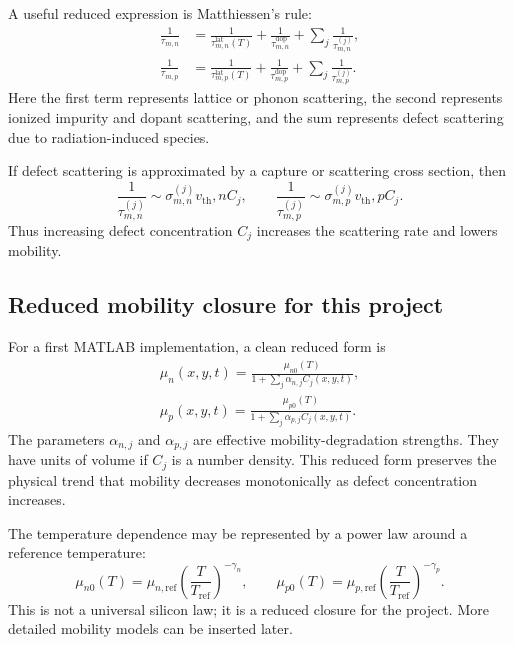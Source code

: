 \documentclass[11pt]{article}
\newcommand{\vt}{v_{\mathrm{th}}}
\begin{document}
A useful reduced expression is Matthiessen's rule:
\begin{align}
\frac{1}{\tau_{m,n}}&=\frac{1}{\tau_{m,n}^{\mathrm{lat}}(T)}+\frac{1}{\tau_{m,n}^{\mathrm{dop}}}+\sum_j \frac{1}{\tau_{m,n}^{(j)}}, \\
\frac{1}{\tau_{m,p}}&=\frac{1}{\tau_{m,p}^{\mathrm{lat}}(T)}+\frac{1}{\tau_{m,p}^{\mathrm{dop}}}+\sum_j \frac{1}{\tau_{m,p}^{(j)}}.
\end{align}
Here the first term represents lattice or phonon scattering, the second represents ionized impurity and dopant scattering, and the sum represents defect scattering due to radiation-induced species.

If defect scattering is approximated by a capture or scattering cross section, then
\begin{equation}
\frac{1}{\tau_{m,n}^{(j)}}\sim \sigma_{m,n}^{(j)} \vt,n C_j,
\qquad
\frac{1}{\tau_{m,p}^{(j)}}\sim \sigma_{m,p}^{(j)} \vt,p C_j.
\end{equation}
Thus increasing defect concentration \(C_j\) increases the scattering rate and lowers mobility.

\subsection{Reduced mobility closure for this project}

For a first MATLAB implementation, a clean reduced form is
\begin{align}
\boxed{\mu_n(x,y,t)=\frac{\mu_{n0}(T)}{1+\sum_j \alpha_{n,j} C_j(x,y,t)},} \\
\boxed{\mu_p(x,y,t)=\frac{\mu_{p0}(T)}{1+\sum_j \alpha_{p,j} C_j(x,y,t)}.}
\end{align}
The parameters \(\alpha_{n,j}\) and \(\alpha_{p,j}\) are effective mobility-degradation strengths. They have units of volume if \(C_j\) is a number density. This reduced form preserves the physical trend that mobility decreases monotonically as defect concentration increases.

The temperature dependence may be represented by a power law around a reference temperature:
\begin{equation}
\mu_{n0}(T)=\mu_{n,\mathrm{ref}}\left(\frac{T}{T_{\mathrm{ref}}}\right)^{-\gamma_n},
\qquad
\mu_{p0}(T)=\mu_{p,\mathrm{ref}}\left(\frac{T}{T_{\mathrm{ref}}}\right)^{-\gamma_p}.
\end{equation}
This is not a universal silicon law; it is a reduced closure for the project. More detailed mobility models can be inserted later.
\end{document}
